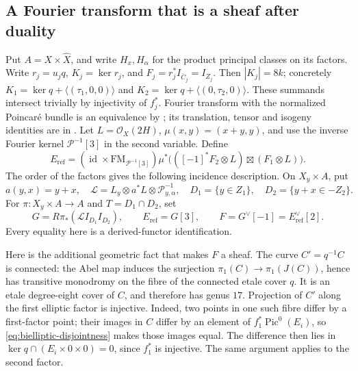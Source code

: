 \subsection{A Fourier transform that is a sheaf after duality}
Put $A=X\times\widehat X$, and write $H_x,H_\alpha$ for the product principal classes on its factors. Write $r_j=u_jq$, $K_j=\ker r_j$, and $F_j=r_j^*I_{\bar C_j}=I_{Z_j}$. Then $|K_j|=8k$; concretely $K_1=\ker q+\langle(\tau_1,0,0)\rangle$ and $K_2=\ker q+\langle(0,\tau_2,0)\rangle$. These summands intersect trivially by injectivity of $f_j^*$. Fourier transform with the normalized Poincar\'e bundle is an equivalence by \cite[Theorem~2.2, p.~156]{Mukai}; its translation, tensor and isogeny identities are in \cite[\S3, especially (3.1) and Proposition~3.11]{Mukai}.
Let $L=\mathcal O_X(2H)$, $\mu(x,y)=(x+y,y)$, and use the inverse
Fourier kernel $\mathcal P^{-1}[3]$ in the second variable. Define
\begin{equation}\label{eq:effective-transform}
 E_{\mathrm{ref}}=
 (\operatorname{id}\times\mathrm{FM}_{\mathcal P^{-1}[3]})
 \mu^*\bigl(([-1]^*F_2\otimes L)\boxtimes(F_1\otimes L)\bigr).
\end{equation}
The order of the factors gives the following incidence description. On $X_y\times A$, put
\[
 a(y,x)=y+x,\quad
 \mathcal L=L_y\otimes a^*L\otimes\mathcal P_{y,\alpha}^{-1},
 \quad D_1=\{y\in Z_1\},\quad D_2=\{y+x\in-Z_2\}.
\]
For $\pi:X_y\times A\to A$ and $T=D_1\cap D_2$, set
\begin{equation}\label{eq:effective-duality}
 G=R\pi_*(\mathcal L I_{D_1}I_{D_2}),
 \qquad E_{\mathrm{ref}}=G[3],\qquad F=G^\vee[-1]
               =E_{\mathrm{ref}}^\vee[2].                 
\end{equation}
Every equality here is a derived-functor identification.

Here is the additional geometric fact that makes $F$ a sheaf.
The curve $C'=q^{-1}C$ is connected: the Abel map induces the
surjection $\pi_1(C)\to\pi_1(J(C))$, hence has transitive monodromy
on the fibre of the connected etale cover $q$. It is an etale
degree-eight cover of $C$, and therefore has genus $17$. Projection
of $C'$ along the first elliptic factor is injective. Indeed, two
points in one such fibre differ by a first-factor point; their
images in $C$ differ by an element of $f_1^*\operatorname{Pic}^0(E_i)$, so \eqref{eq:bielliptic-disjointness} makes those
images equal. The difference then lies in
$\ker q\cap(E_i\times0\times0)=0$, since $f_1^*$ is injective.
The same argument applies to the second factor.

